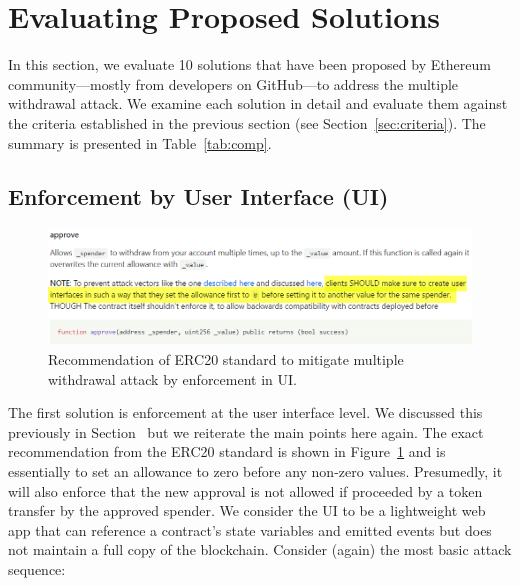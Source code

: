 
\section{Evaluating Proposed Solutions}\label{sec:eval}

In this section, we evaluate 10 solutions that have been proposed by Ethereum community---mostly from developers on GitHub---to address the multiple withdrawal attack. We examine each solution in detail and evaluate them against the criteria established in the previous section (see Section~\ref{sec:criteria}). The summary is presented in Table~\ref{tab:comp}.

\subsection{Enforcement by User Interface (UI)}
\label{sec:enfui}

\begin{figure}[t!]
	\centering
	\includegraphics[width=1.0\linewidth]{figures/multiple_withdrawal_03.png}
	\caption{Recommendation of ERC20 standard to mitigate multiple withdrawal attack by enforcement in UI.\label{fig:uie}}
\end{figure}

The first solution is enforcement at the user interface level. We discussed this previously in Section~\label{sec:preui} but we reiterate the main points here again. The exact recommendation from the ERC20 standard is shown in Figure~\ref{fig:uie} and is essentially to set an allowance to zero before any non-zero values. Presumedly, it will also enforce that the new approval is not allowed if proceeded by a token transfer by the approved spender. We consider the UI to be a lightweight web app that can reference a contract's state variables and emitted events but does not maintain a full copy of the blockchain. Consider (again) the most basic attack sequence:


